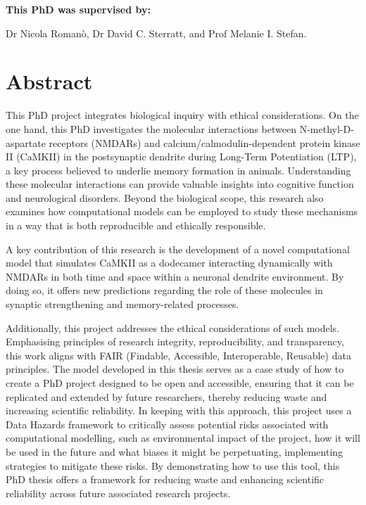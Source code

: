 \documentclass[
  11pt,
  letterpaper,
]{scrreprt}
\begin{document}
\vspace*{\fill}
\begin{center}
    {\large\bfseries This PhD was supervised by:}
    
    \vspace{2ex}
    
    {\large Dr Nicola Romanò, Dr David C. Sterratt, and Prof Melanie I. Stefan.}
\end{center}
\vfill


\chapter*{Abstract}\label{abstract}


This PhD project integrates biological inquiry with ethical
considerations. On the one hand, this PhD investigates the molecular
interactions between N-methyl-D-aspartate receptors (NMDARs) and
calcium/calmodulin-dependent protein kinase II (CaMKII) in the
postsynaptic dendrite during Long-Term Potentiation (LTP), a key process
believed to underlie memory formation in animals. Understanding these
molecular interactions can provide valuable insights into cognitive
function and neurological disorders. Beyond the biological scope, this
research also examines how computational models can be employed to study
these mechanisms in a way that is both reproducible and ethically
responsible.

A key contribution of this research is the development of a novel
computational model that simulates CaMKII as a dodecamer interacting
dynamically with NMDARs in both time and space within a neuronal
dendrite environment. By doing so, it offers new predictions regarding
the role of these molecules in synaptic strengthening and memory-related
processes.

Additionally, this project addresses the ethical considerations of such
models. Emphasising principles of research integrity, reproducibility,
and transparency, this work aligns with FAIR (Findable, Accessible,
Interoperable, Reusable) data principles. The model developed in this
thesis serves as a case study of how to create a PhD project designed to
be open and accessible, ensuring that it can be replicated and extended
by future researchers, thereby reducing waste and increasing scientific
reliability. In keeping with this approach, this project uses a Data
Hazards framework to critically assess potential risks associated with
computational modelling, such as environmental impact of the project,
how it will be used in the future and what biases it might be
perpetuating, implementing strategies to mitigate these risks. By
demonstrating how to use this tool, this PhD thesis offers a framework
for reducing waste and enhancing scientific reliability across future
associated research projects.
\end{document}
